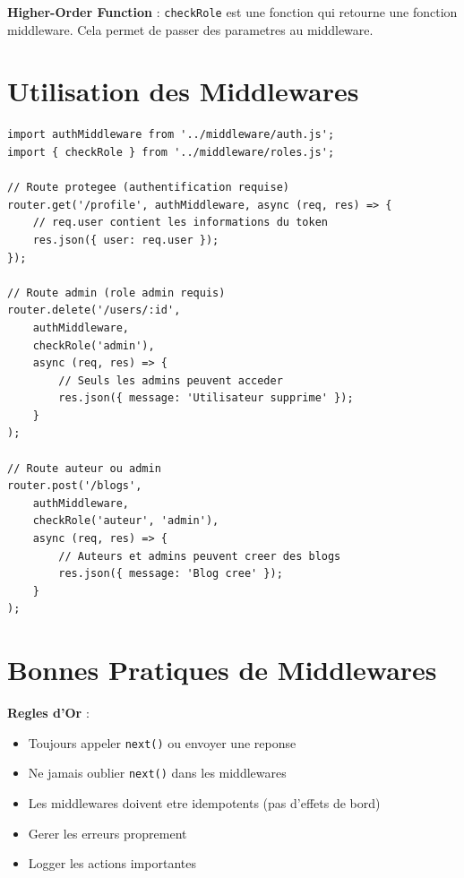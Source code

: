 \documentclass[a4paper,12pt]{book}
\begin{document}
\begin{definitionbox}
    \textbf{Higher-Order Function} : \texttt{checkRole} est une fonction qui retourne une fonction middleware. Cela permet de passer des parametres au middleware.
\end{definitionbox}

\section{Utilisation des Middlewares}

\begin{lstlisting}[style=javascript, caption=Utilisation des middlewares dans les routes]
import authMiddleware from '../middleware/auth.js';
import { checkRole } from '../middleware/roles.js';

// Route protegee (authentification requise)
router.get('/profile', authMiddleware, async (req, res) => {
    // req.user contient les informations du token
    res.json({ user: req.user });
});

// Route admin (role admin requis)
router.delete('/users/:id',
    authMiddleware,
    checkRole('admin'),
    async (req, res) => {
        // Seuls les admins peuvent acceder
        res.json({ message: 'Utilisateur supprime' });
    }
);

// Route auteur ou admin
router.post('/blogs',
    authMiddleware,
    checkRole('auteur', 'admin'),
    async (req, res) => {
        // Auteurs et admins peuvent creer des blogs
        res.json({ message: 'Blog cree' });
    }
);
\end{lstlisting}

\section{Bonnes Pratiques de Middlewares}

\begin{bestpracticebox}
    \textbf{Regles d'Or} :
    \begin{itemize}
        \item Toujours appeler \texttt{next()} ou envoyer une reponse
        \item Ne jamais oublier \texttt{next()} dans les middlewares
        \item Les middlewares doivent etre idempotents (pas d'effets de bord)
        \item Gerer les erreurs proprement
        \item Logger les actions importantes
    \end{itemize}
\end{bestpracticebox}
\end{document}
